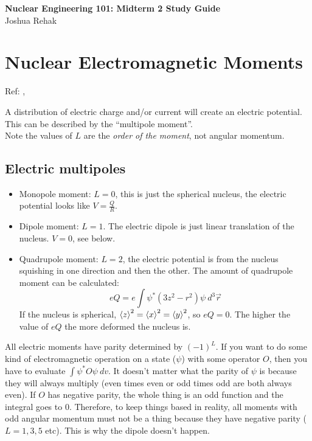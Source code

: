 \documentclass[letter]{article}
\begin{document}
\textbf{\Large{Nuclear Engineering 101: Midterm 2 Study Guide}} \\
Joshua Rehak
\vspace{12pt}

\section*{Nuclear Electromagnetic Moments}

Ref: \cite[pp. 71-75]{krane},\cite[Lec 10]{lecture}

A distribution of electric charge and/or current will create an
electric potential. This can be described by the ``multipole
moment''. \\

Note the values of $L$ are the \textit{order of the moment}, not
angular momentum.

\subsection*{Electric multipoles}

\begin{itemize}
\item Monopole moment: $L=0$, this is just the spherical nucleus, the electric
  potential looks like $V = \frac{Q}{R}$. 
\item Dipole moment: $L=1$. The electric dipole is just linear
  translation of the nucleus. $V=0$, see below.
\item Quadrupole moment: $L=2$, the electric potential is from the
  nucleus squishing in one direction and then the other. The amount of
  quadrupole moment can be calculated:
  \begin{equation*}
    eQ=e\int\psi^*(3z^2-r^2)\psi~d^3\vec{r}
  \end{equation*}
  If the nucleus is spherical,
  $\braket{z}^2=\braket{x}^2=\braket{y}^2$, so $eQ=0$. The higher the
  value of $eQ$ the more deformed the nucleus is.
\end{itemize}

All electric moments have parity determined by $(-1)^L$. If you want
to do some kind of electromagnetic operation on a state ($\psi$) with
some operator $O$, then you have to evaluate $\int\psi^*O\psi~dv$. It
doesn't matter what the parity of $\psi$ is because they will always
multiply (even times even or odd times odd are both always even). If
$O$ has negative parity, the whole thing is an odd function and the
integral goes to 0. Therefore, to keep things based in reality, all
 moments with odd angular momentum must not be a thing because they
 have negative parity
($L=1,3,5$ etc). This is why the dipole doesn't happen.
\end{document}
